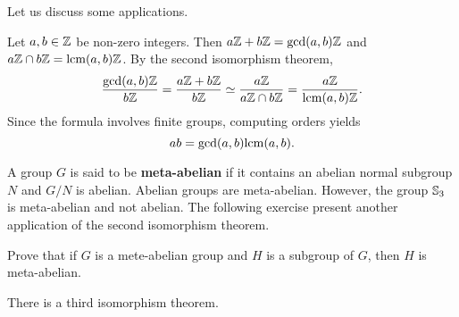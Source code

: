 Let us discuss some applications. 

\begin{example}
Let $a,b\in\mathbb{Z}$ be non-zero integers. Then $a\mathbb{Z}+b\mathbb{Z}=\gcd(a,b)\mathbb{Z}$ and $a\mathbb{Z}\cap b\mathbb{Z}=\mathrm{lcm}(a,b)\mathbb{Z}$. By the second isomorphism theorem,
\[
\frac{\gcd(a,b)\mathbb{Z}}{b\mathbb{Z}}=\frac{a\mathbb{Z}+b\mathbb{Z}}{b\mathbb{Z}}\simeq
\frac{a\mathbb{Z}}{a\mathbb{Z}\cap b\mathbb{Z}}=\frac{a\mathbb{Z}}{\mathrm{lcm}(a,b)\mathbb{Z}}.
\]
Since the formula involves finite groups, 
computing orders yields 
\[
ab=\gcd(a,b)\mathrm{lcm}(a,b).
\]
\end{example}


A group $G$ is said to be \textbf{meta-abelian}
if it contains an abelian normal subgroup $N$ and $G/N$
is abelian. Abelian groups are meta-abelian. However, the group $\mathbb{S}_3$ is meta-abelian and not abelian.  The following exercise
present another application of the second isomorphism theorem. 

\begin{exercise}
Prove that if $G$ is a mete-abelian group and $H$ is a subgroup of
$G$, then $H$ is meta-abelian. 
\end{exercise}


There is a third isomorphism theorem. 


